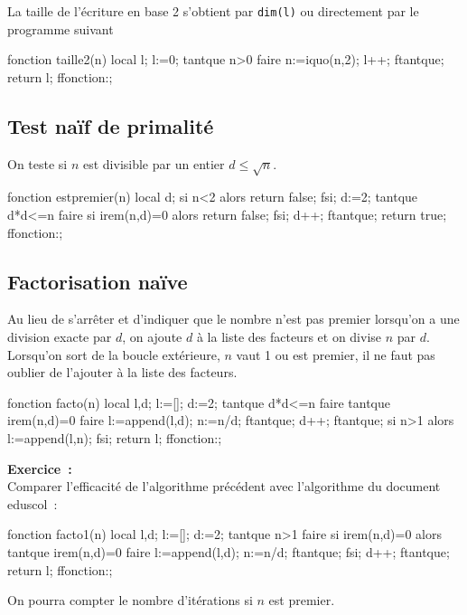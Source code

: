 \documentclass[12pt,a4paper]{book}
\begin{document}
\begin{giacjshere}
La taille de l'\'ecriture en base 2 s'obtient par \verb|dim(l)|
ou directement par le programme suivant
\begin{giaconload}
fonction taille2(n)
  local l;
  l:=0;
  tantque n>0 faire
    n:=iquo(n,2);
    l++;
  ftantque;
  return l;
ffonction:;
\end{giaconload}

\subsection{Test na\"if de primalit\'e}
On teste si $n$ est divisible par un entier $d\leq \sqrt{n}$.
\begin{giaconload}
fonction estpremier(n)
  local d;
  si n<2 alors return false; fsi;
  d:=2;
  tantque d*d<=n faire
    si irem(n,d)=0 alors return false; fsi;
    d++;
  ftantque;
  return true;
ffonction:;
\end{giaconload}

\subsection{Factorisation na\"ive}
Au lieu de s'arr\^eter et d'indiquer que le nombre n'est pas premier
lorsqu'on a une division exacte par $d$, on ajoute $d$
\`a la liste des facteurs et on divise $n$ par $d$.
Lorsqu'on sort de la boucle ext\'erieure, $n$ vaut 1 ou est premier, 
il ne faut pas oublier de l'ajouter \`a la liste des facteurs.
\begin{giaconload}
fonction facto(n)
  local l,d;
  l:=[]; d:=2;
  tantque d*d<=n faire
    tantque irem(n,d)=0 faire
      l:=append(l,d);
      n:=n/d;
    ftantque;
    d++;
  ftantque;
  si n>1 alors l:=append(l,n); fsi;
  return l;
ffonction:;
\end{giaconload}
{\bf Exercice~:}\\
 Comparer l'efficacit\'e de l'algorithme pr\'ec\'edent avec l'algorithme du 
document eduscol~:
\begin{giaconload}
fonction facto1(n)
  local l,d;
  l:=[]; d:=2;
  tantque n>1 faire
    si irem(n,d)=0 alors
      tantque irem(n,d)=0 faire
        l:=append(l,d);
        n:=n/d;
      ftantque;
    fsi;
    d++;
  ftantque;
  return l;
ffonction:;
\end{giaconload}
On pourra compter le nombre d'it\'erations si $n$ est premier.


\end{giacjshere}
\end{document}
